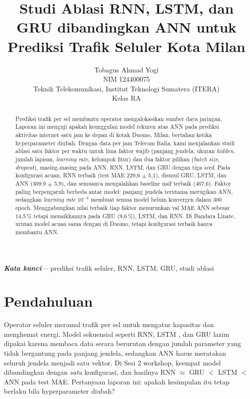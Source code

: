 \documentclass[10pt,twocolumn,a4paper]{article}
\makeatletter
\newcommand{\IEEEauthorblockN}[1]{{\large #1}\par}
\newcommand{\IEEEauthorblockA}[1]{{\small #1}\par}
\newenvironment{IEEEkeywords}{\par\noindent\small\textbf{\textit{Kata kunci}}---}{\par}
\renewcommand{\maketitle}{\twocolumn[\begin{center}{\LARGE\bfseries \@title\par}\vspace{6pt}\@author\vspace{8pt}\end{center}]}
\makeatother
\begin{document}
\title{Studi Ablasi RNN, LSTM, dan GRU dibandingkan ANN untuk Prediksi Trafik Seluler Kota Milan}

\author{
\IEEEauthorblockN{Tobagus Ahmad Yogi}
\IEEEauthorblockA{NIM 124400075\\
Teknik Telekomunikasi, Institut Teknologi Sumatera (ITERA)\\
Kelas RA}
}

\maketitle

\begin{abstract}
Prediksi trafik per sel membantu operator mengalokasikan sumber daya jaringan. Laporan ini menguji apakah keunggulan model rekuren atas ANN pada prediksi aktivitas internet satu jam ke depan di kotak Duomo, Milan, bertahan ketika hyperparameter diubah. Dengan data per jam Telecom Italia, kami menjalankan studi ablasi satu faktor per waktu untuk lima faktor wajib (panjang jendela, ukuran \textit{hidden}, jumlah lapisan, \textit{learning rate}, kelompok fitur) dan dua faktor pilihan (\textit{batch size}, \textit{dropout}), masing-masing pada ANN, RNN, LSTM, dan GRU dengan tiga \textit{seed}. Pada konfigurasi acuan, RNN terbaik (test MAE 229,6 $\pm$ 5,1), disusul GRU, LSTM, dan ANN (309,9 $\pm$ 5,9), dan semuanya mengalahkan baseline naif terbaik (467,6). Faktor paling berpengaruh berbeda antar model: panjang jendela terutama merugikan ANN, sedangkan \textit{learning rate} $10^{-4}$ membuat semua model belum konvergen dalam 300 epoch. Menggabungkan nilai terbaik tiap faktor menurunkan val MAE ANN sebesar 14,5\,\% tetapi menaikkannya pada GRU (9,6\,\%), LSTM, dan RNN. Di Bandara Linate, urutan model acuan sama dengan di Duomo, tetapi konfigurasi terbaik hanya membantu ANN.
\end{abstract}

\begin{IEEEkeywords}
prediksi trafik seluler, RNN, LSTM, GRU, studi ablasi
\end{IEEEkeywords}

\section{Pendahuluan}
Operator seluler meramal trafik per sel untuk mengatur kapasitas dan menghemat energi. Model sekuensial seperti RNN, LSTM \cite{hochreiter1997lstm}, dan GRU \cite{cho2014gru} lazim dipakai karena membaca data secara berurutan dengan jumlah parameter yang tidak bergantung pada panjang jendela, sedangkan ANN harus meratakan seluruh jendela menjadi satu vektor. Di Sesi 2 workshop, keempat model dibandingkan dengan \emph{satu} konfigurasi, dan hasilnya RNN $\approx$ GRU $<$ LSTM $<$ ANN pada test MAE. Pertanyaan laporan ini: apakah kesimpulan itu tetap berlaku bila hyperparameter diubah?
\end{document}
